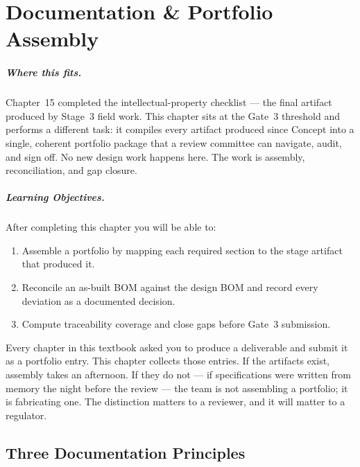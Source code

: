 
\chapter{Documentation \& Portfolio Assembly}
\label{ch16}

\paragraph{Where this fits.}
Chapter~15 completed the intellectual-property checklist --- the final artifact
produced by Stage~3 field work.
This chapter sits at the Gate~3 threshold and performs a different task: it
compiles every artifact produced since Concept into a single, coherent portfolio
package that a review committee can navigate, audit, and sign off.
No new design work happens here.
The work is assembly, reconciliation, and gap closure.

\paragraph{Learning Objectives.}
After completing this chapter you will be able to:
\begin{enumerate}
  \item Assemble a portfolio by mapping each required section to the stage
        artifact that produced it.
  \item Reconcile an as-built BOM against the design BOM and record every
        deviation as a documented decision.
  \item Compute traceability coverage and close gaps before Gate~3 submission.
\end{enumerate}

Every chapter in this textbook asked you to produce a deliverable and submit it
as a portfolio entry.
This chapter collects those entries.
If the artifacts exist, assembly takes an afternoon.
If they do not --- if specifications were written from memory the night before
the review --- the team is not assembling a portfolio; it is fabricating one.
The distinction matters to a reviewer, and it will matter to a regulator.

\section{Three Documentation Principles}
\label{sec:ch16-principles}

